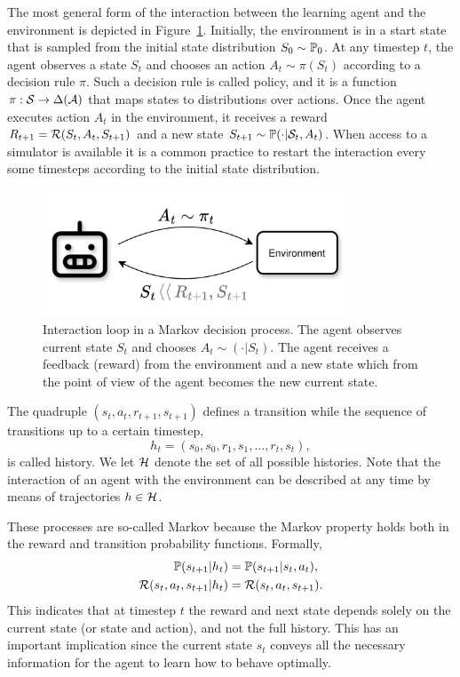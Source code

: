 The most general form of the interaction between the learning agent and the environment is depicted in Figure~\ref{fig:rl_loop}. Initially, the environment is in a start state that is sampled from the initial state distribution $S_0\sim\mathbb{P}_0$. At any timestep $t$, the agent observes a state $S_t$ and chooses an action $A_t\sim\pi(S_t)$ according to a decision rule $\pi$. Such a decision rule is called policy, and it is a function 
$\pi:\mathcal{S}\rightarrow\Delta(\mathcal{A})$ that maps states to distributions over actions. Once the agent executes action $A_t$ in the environment, it receives a reward $R_{t+1} = \mathcal{R}(S_t, A_t, S_{t+1})$ and a new state $S_{t+1}\sim\mathbb{P}(\cdot\lvert\mathcal{S}_t, A_t)$. When access to a simulator is available it is a common practice to restart the interaction every some timesteps according to the initial state distribution. 
\begin{figure}
  \centering
  \includegraphics[width=0.8\textwidth]{figures/background/RL_loop.png}
  \caption{Interaction loop in a Markov decision process. The agent observes current state $S_t$ and chooses $A_t\sim(\cdot\lvert S_t)$. The agent receives a feedback (reward) from the environment and a new state which from the point of view of the agent becomes the new current state. }
  \label{fig:rl_loop}
\end{figure}


The quadruple $(s_t, a_t, r_{t+1}, s_{t+1})$ defines a transition while the sequence of transitions up to a certain timestep, \begin{equation*}
  h_t = (s_0, s_0, r_1, s_1,\dots,r_t,s_t),
\end{equation*}
is called history. We let $\mathcal{H}$ denote the set of all possible histories. Note that the interaction of an agent with the environment can be described at any time by means of trajectories $h\in\mathcal{H}$.

These processes are so-called Markov because the Markov property holds both in the reward and transition probability functions. Formally,
\begin{align*}
  \mathbb{P}(s_{t+1}\lvert h_t) &= \mathbb{P}(s_{t+1}\lvert s_t, a_t), \\
  \mathcal{R}(s_t, a_t, s_{t+1}\lvert h_t) &=  \mathcal{R}(s_t, a_t, s_{t+1}).
\end{align*}
This indicates that at timestep $t$ the reward and next state depends solely on the current state (or state and action), and not the full history. This has an important implication since the current state $s_t$ conveys all the necessary information for the agent to learn how to behave optimally.

